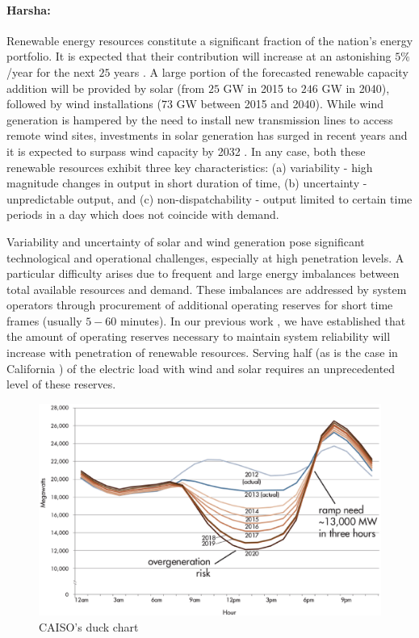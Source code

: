\paragraph{Harsha:} Renewable energy resources constitute a significant fraction of the nation's energy portfolio. It is expected that their contribution will increase at an astonishing $5\%$/year for the next $25$ years \cite{AEO2016}. A large portion of the forecasted renewable capacity addition will be provided by solar (from $25$ GW in 2015 to $246$ GW in 2040), followed by wind installations ($73$ GW between 2015 and 2040). While wind generation is hampered by the need to install new transmission lines to access remote wind sites, investments in solar generation has surged in recent years and it is expected to surpass wind capacity by 2032 \cite{AEO2016}. In any case, both these renewable resources exhibit three key characteristics: (a) variability - high magnitude changes in output in short duration of time, (b) uncertainty - unpredictable output, and (c) non-dispatchability - output limited to certain time periods in a day which does not coincide with demand. 

\gap{}

Variability and uncertainty of solar and wind generation pose significant technological and operational challenges, especially at high penetration levels. A particular difficulty arises due to frequent and large energy imbalances between total available resources and demand. These imbalances are addressed by system operators through procurement of additional operating reserves for short time frames (usually $5-60$ minutes). In our previous work \cite{Gang16a}, we have established that the amount of operating reserves necessary to maintain system reliability will increase with penetration of renewable resources. Serving half (as is the case in California \cite{SB350}) of the electric load with wind and solar requires an unprecedented level of these reserves. 

\gap

\begin{figure}
\centering
\vspace*{-0.6cm}
\includegraphics[scale=0.2]{./figures/duckChart}
\caption{CAISO's duck chart} \label{fig:duck}
\end{figure}

